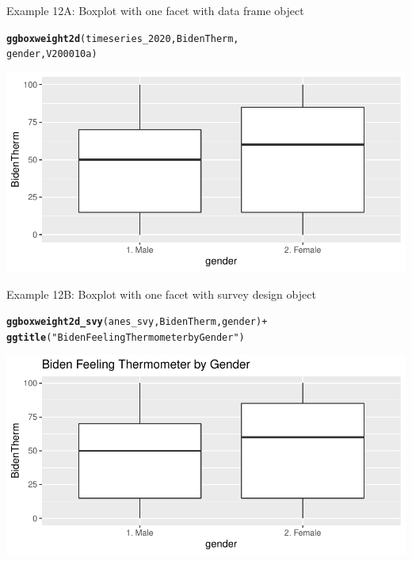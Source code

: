 \documentclass{beamer}\usepackage[]{graphicx}\usepackage[]{color}
\makeatletter
\newcommand{\hlstr}[1]{\textcolor[rgb]{0.192,0.494,0.8}{#1}}%
\newcommand{\hlopt}[1]{\textcolor[rgb]{0,0,0}{#1}}%
\newcommand{\hlstd}[1]{\textcolor[rgb]{0.345,0.345,0.345}{#1}}%
\newcommand{\hlkwd}[1]{\textcolor[rgb]{0.737,0.353,0.396}{\textbf{#1}}}%
\newenvironment{kframe}{%
 \def\at@end@of@kframe{}%
 \ifinner\ifhmode%
  \def\at@end@of@kframe{\end{minipage}}%
  \begin{minipage}{\columnwidth}%
 \fi\fi%
 \def\FrameCommand##1{\hskip\@totalleftmargin \hskip-\fboxsep
 \colorbox{shadecolor}{##1}\hskip-\fboxsep
     \hskip-\linewidth \hskip-\@totalleftmargin \hskip\columnwidth}%
 \MakeFramed {\advance\hsize-\width
   \@totalleftmargin\z@ \linewidth\hsize
   \@setminipage}}%
 {\par\unskip\endMakeFramed%
 \at@end@of@kframe}
\newenvironment{knitrout}{}{} %
\makeatother
\begin{document}
\begin{frame}[fragile]{Example 12A: Boxplot with one facet with data frame object}
\begin{knitrout}
\color{fgcolor}\begin{kframe}
\begin{alltt}
\hlkwd{ggboxweight2d}\hlstd{(timeseries_2020, BidenTherm,}
    \hlstd{gender, V200010a)}
\end{alltt}
\end{kframe}
\includegraphics[width=0.95\linewidth]{figure/unnamed-chunk-47-1} 
\end{knitrout}
\end{frame}

\begin{frame}[fragile]{Example 12B: Boxplot with one facet with survey design object}
\begin{knitrout}
\color{fgcolor}\begin{kframe}
\begin{alltt}
\hlkwd{ggboxweight2d_svy}\hlstd{(anes_svy, BidenTherm, gender)} \hlopt{+}
    \hlkwd{ggtitle}\hlstd{(}\hlstr{"Biden Feeling Thermometer by Gender"}\hlstd{)}
\end{alltt}
\end{kframe}
\includegraphics[width=0.95\linewidth]{figure/unnamed-chunk-48-1} 
\end{knitrout}

\end{frame}
\end{document}
